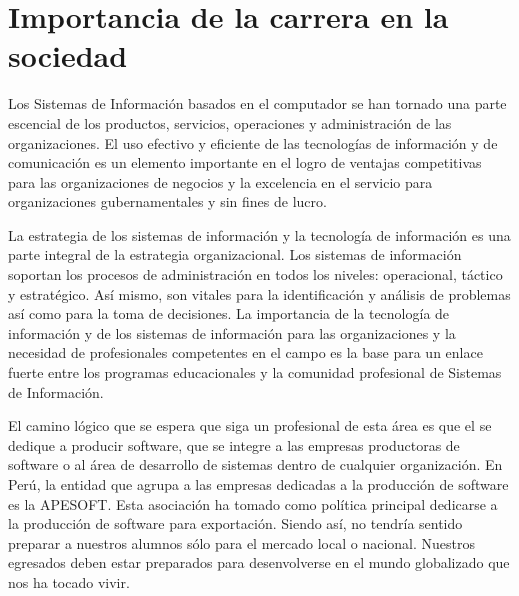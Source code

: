 \section{Importancia de la carrera en la sociedad}\label{sec:cs-importancia-en-la-sociedad}

Los Sistemas de Información basados en el computador se han tornado una parte escencial de los productos, servicios, operaciones y administración de las organizaciones. El uso efectivo y eficiente de las tecnologí­as de información y de comunicación es un elemento importante en el logro de ventajas competitivas para las organizaciones de negocios y la excelencia en el servicio para organizaciones gubernamentales y sin fines de lucro. 

La estrategia de los sistemas de información y la tecnologí­a de información es una parte integral de la estrategia organizacional. Los sistemas de información soportan los procesos de administración en todos los niveles: operacional, táctico y estratégico. Así­ mismo, son vitales para la identificación y análisis de problemas así­ como para la toma de decisiones. La importancia de la tecnologí­a de información y de los sistemas de información para las organizaciones y la necesidad de profesionales competentes en el campo es la base para un enlace fuerte entre los programas educacionales y la comunidad profesional de Sistemas de Información.

El camino lógico que se espera que siga un profesional de esta área es que el se dedique a 
producir software, que se integre a las empresas productoras de software o al área de desarrollo de sistemas
dentro de cualquier organización. En Perú, la entidad que agrupa a las empresas dedicadas a la producción de software es la \ac{APESOFT}. Esta asociación ha tomado como polí­tica principal dedicarse a la producción de software para exportación. Siendo así­, no tendrí­a sentido preparar a nuestros alumnos sólo para el mercado local o nacional. Nuestros egresados deben estar preparados para desenvolverse en el mundo globalizado que nos ha tocado vivir.
